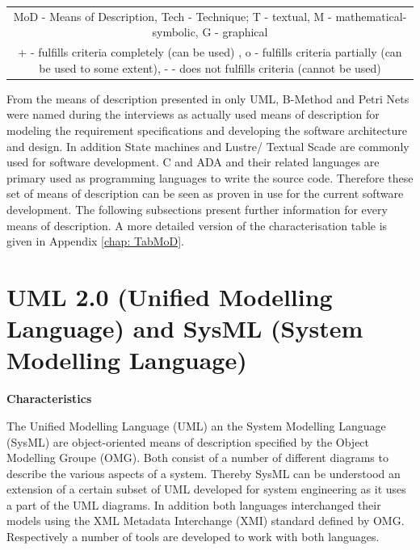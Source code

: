 \documentclass{./template/openetcs2}
\begin{document}
\begin{center}
\begin{landscape}
\begin{table}[htp]
\begin{tabular}{|m{6cm}|m{0.8cm}|m{0.5cm}|m{0.8cm}|m{0.8cm}|m{0.8cm}|m{0.8cm}|m{0.8cm}|m{0.8cm}|m{0.5cm}||m{0.8cm}|m{1.5cm}|m{1.5cm}|m{2cm}|}
\multicolumn{14}{|c|}{MoD - Means of Description, Tech - Technique; T - textual, M - mathematical-symbolic, G - graphical} \\
\multicolumn{14}{|c|}{+ - fulfills criteria completely  (can be used) , o - fulfills criteria partially (can be used to some extent), - - does not fulfills criteria (cannot be used)} \\ \hline

\end{tabular}
\end{table}

   \end{landscape}
\end{center}


From the means of description presented in  \citeauthor{EN50128:2011}  only UML, B-Method and Petri Nets were named during the interviews as actually used means of description for modeling the requirement specifications and developing the software architecture and design. In addition State machines and Lustre/ Textual Scade are commonly used for software development. C and ADA and their related languages are primary used as programming languages to write the source code. Therefore these set of means of description can be seen as proven in use for the current software development. The following subsections present further information for every means of description. A more detailed version of the characterisation table is given in Appendix \ref{chap: TabMoD}.

\section{UML 2.0 (Unified Modelling Language) and SysML (System Modelling Language)}


	\textbf{Characteristics}

	The Unified Modelling Language (UML) an the System Modelling Language (SysML) are object-oriented means of description specified by the Object Modelling Groupe (OMG). Both consist of a number of different diagrams to describe the various aspects of a system. Thereby SysML can be understood an extension of a certain subset of UML developed for system engineering as it uses a part of the UML diagrams. In addition both languages interchanged their models using the XML Metadata Interchange (XMI) standard defined by OMG. Respectively a number of tools are developed to work with both languages.
\end{document}
